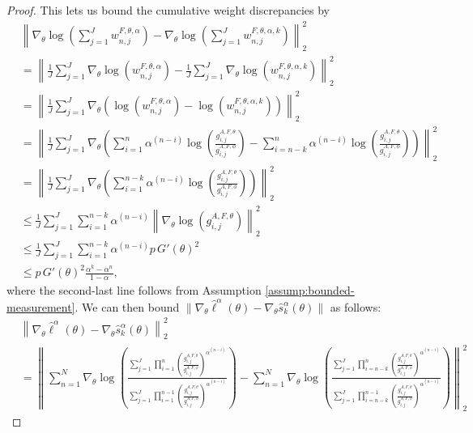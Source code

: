 \begin{proof}
This lets us bound the cumulative weight discrepancies by
\begin{align}
    &  \left\lVert\nabla_\theta\log\left(\sum_{j=1}^J w_{n,j}^{F,\theta,\alpha}\right)-\nabla_\theta\log\left(\sum_{j=1}^J w_{n,j}^{F,\theta,\alpha,k}\right)\right\rVert_2^2\\
    &= \left\lVert\frac{1}{J}\sum_{j=1}^J \nabla_\theta \log\left(w_{n,j}^{F,\theta,\alpha}\right)-\frac{1}{J}\sum_{j=1}^J \nabla_\theta \log\left(w_{n,j}^{F,\theta,\alpha,k}\right)\right\rVert_2^2 \\
    &= \left\lVert\frac{1}{J}\sum_{j=1}^J \nabla_\theta \left(\log\left(w_{n,j}^{F,\theta,\alpha}\right)-\log\left(w_{n,j}^{F,\theta,\alpha,k}\right)\right)\right\rVert_2^2\\
    &= \left\lVert\frac{1}{J}\sum_{j=1}^J \nabla_\theta \left(\sum_{i=1}^n\alpha^{(n-i)}\log\left(\frac{g_{i,j}^{A,F,\theta}}{g_{i,j}^{A,F,\phi}} \right) - \sum_{i=n-k}^n{\alpha^{(n-i)}}\log\left(\frac{g_{i,j}^{A,F,\theta}}{g_{i,j}^{A,F,\phi}} \right)\right)\right\rVert_2^2 \\
    &= \left\lVert\frac{1}{J}\sum_{j=1}^J \nabla_\theta \left(\sum_{i=1}^{n-k}\alpha^{(n-i)}\log\left(\frac{g_{i,j}^{A,F,\theta}}{g_{i,j}^{A,F,\phi}} \right) \right)\right\rVert_2^2\\
    &\leq \frac{1}{J}\sum_{j=1}^J \sum_{i=1}^{n-k}\alpha^{(n-i)}\left\lVert\nabla_\theta\log\left(g_{i,j}^{A,F,\theta} \right)\right\rVert_2^2\\
    &\leq \frac{1}{J}\sum_{j=1}^J \sum_{i=1}^{n-k}\alpha^{(n-i)}p \, G'(\theta)^2\\
    &\leq p \, G'(\theta)^2\frac{\alpha^k-\alpha^n}{1-\alpha},
\end{align}
where the second-last line follows from Assumption \ref{assump:bounded-measurement}.
We can then bound $\|\nabla_\theta\hat\ell^\alpha(\theta) - \nabla_\theta \hat s_k^\alpha(\theta)\|$ as follows:
{\small
\begin{align}
    &\left\lVert\nabla_\theta\hat\ell^\alpha(\theta) - \nabla_\theta \hat s_k^\alpha(\theta) \right\rVert_2^2
    \\ \nonumber
    &= \left\lVert\sum_{n=1}^N \nabla_\theta \log\left(\frac{\sum_{j=1}^J\prod_{i=1}^n\left(\frac{g_{i,j}^{A,F,\theta}}{g_{i,j}^{A,F,\phi}} \right)^{\alpha^{(n-i)}}}{\sum_{j=1}^J\prod_{i=1}^{n-1}\left(\frac{g_{i,j}^{A,F,\theta}}{g_{i,j}^{A,F,\phi}} \right)^{\alpha^{(n-i)}}}\right) - \sum_{n=1}^N \nabla_\theta\log\left(\frac{\sum_{j=1}^J\prod_{i=n-k}^n\left(\frac{g_{i,j}^{A,F,\theta}}{g_{i,j}^{A,F,\phi}} \right)^{\alpha^{(n-i)}}}{\sum_{j=1}^J\prod_{i=n-k}^{n-1}\left(\frac{g_{i,j}^{A,F,\theta}}{g_{i,j}^{A,F,\phi}} \right)^{\alpha^{(n-i)}}}\right) \right\rVert_2^2

\end{align}}
\end{proof}
